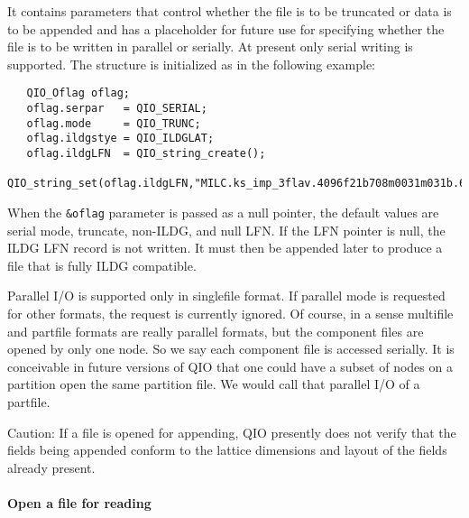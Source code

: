 \documentclass{article}
\begin{document}
It contains parameters that control whether the file is to be
truncated or data is to be appended and has a placeholder for future
use for specifying whether the file is to be written in parallel or
serially.  At present only serial writing is supported.  The structure
is initialized as in the following example:

%
\begin{verbatim}
   QIO_Oflag oflag;
   oflag.serpar   = QIO_SERIAL;
   oflag.mode     = QIO_TRUNC;
   oflag.ildgstye = QIO_ILDGLAT;
   oflag.ildgLFN  = QIO_string_create();
   QIO_string_set(oflag.ildgLFN,"MILC.ks_imp_3flav.4096f21b708m0031m031b.696");
\end{verbatim}
%

When the \verb|&oflag| parameter is passed as a null pointer, the
default values are serial mode, truncate, non-ILDG, and null LFN.  If
the LFN pointer is null, the ILDG LFN record is not written.  It must
then be appended later to produce a file that is fully ILDG compatible.

Parallel I/O is supported only in singlefile format.  If parallel mode
is requested for other formats, the request is currently ignored.  Of
course, in a sense multifile and partfile formats are really parallel
formats, but the component files are opened by only one node.  So we
say each component file is accessed serially.  It is conceivable in
future versions of QIO that one could have a subset of nodes on a
partition open the same partition file.  We would call that parallel
I/O of a partfile.

Caution: If a file is opened for appending, QIO presently does not
verify that the fields being appended conform to the lattice
dimensions and layout of the fields already present.


\paragraph{Open a file for reading}
\end{document}
